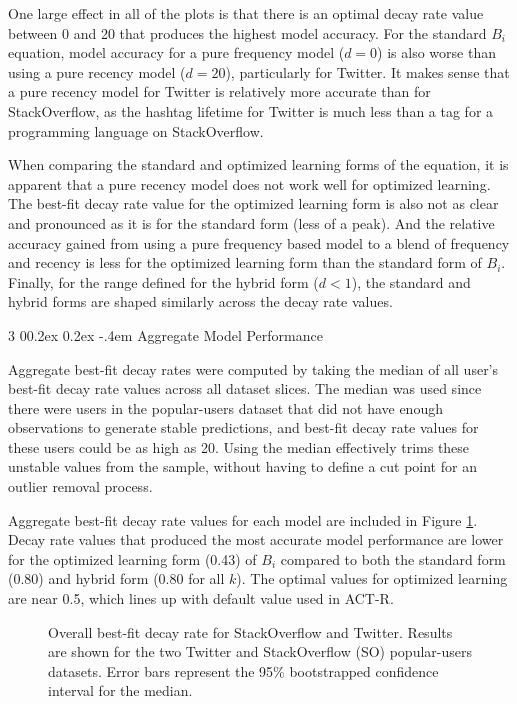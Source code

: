 \documentclass[man,floatsintext,donotrepeattitle]{apa6}
\makeatletter
\renewcommand{\subsubsection}{%
  \@startsection
  {subsubsection}%
  {3}%
  {\parindent}%
  {0\baselineskip \@plus 0.2ex \@minus 0.2ex}%
  {-.4em}%
  {\normalfont\normalsize\bfseries\addperi}}
\makeatother
\begin{document}
One large effect in all of the plots is that there is an optimal decay rate value between 0 and 20 that produces the highest model accuracy.
For the standard $B_{i}$ equation, model accuracy for a pure frequency model ($d=0$) is also worse than using a pure recency model ($d=20$), particularly for Twitter.
It makes sense that a pure recency model for Twitter is relatively more accurate than for StackOverflow, as the hashtag lifetime for Twitter is much less than a tag for a programming language on StackOverflow.

When comparing the standard and optimized learning forms of the equation, it is apparent that a pure recency model does not work well for optimized learning.
The best-fit decay rate value for the optimized learning form is also not as clear and pronounced as it is for the standard form (less of a peak).
And the relative accuracy gained from using a pure frequency based model to a blend of frequency and recency is less for the optimized learning form than the standard form of $B_{i}$.
Finally, for the range defined for the hybrid form ($d < 1$), the standard and hybrid forms are shaped similarly across the decay rate values.

\subsubsection{Aggregate Model Performance}

Aggregate best-fit decay rates were computed by taking the median of all user's best-fit decay rate values across all dataset slices.
The median was used since there were users in the popular-users dataset that did not have enough observations to generate stable predictions, and best-fit decay rate values for these users could be as high as 20.
Using the median effectively trims these unstable values from the sample, without having to define a cut point for an outlier removal process.

Aggregate best-fit decay rate values for each model are included in Figure \ref{figPriorDecay}.
Decay rate values that produced the most accurate model performance are lower for the optimized learning form (\num{.43}) of $B_{i}$ compared to both the standard form (\num{.80}) and hybrid form (\num{.80} for all $k$).
The optimal values for optimized learning are near \num{0.5}, which lines up with default value used in ACT-R.

\begin{figure}[!htbp]
  \caption{
  Overall best-fit decay rate for StackOverflow and Twitter.
  Results are shown for the two Twitter and StackOverflow (SO) popular-users datasets.
  Error bars represent the 95\% bootstrapped confidence interval for the median.
}
  \label{figPriorDecay}
\end{figure}
\end{document}
